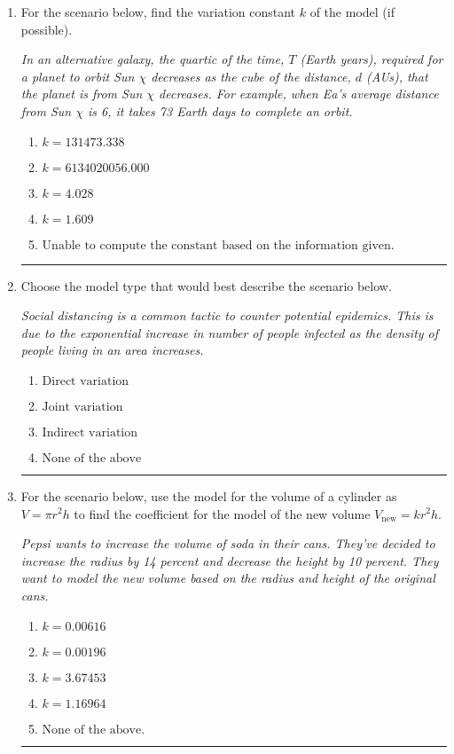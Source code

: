 \documentclass[14pt]{extbook}
\newcommand{\litem}[1]{\item#1\hspace*{-1cm}\rule{\textwidth}{0.4pt}}
\begin{document}
\begin{enumerate}
{\begin{enumerate}[label=\Alph*.]
\end{enumerate} }
\litem{
For the scenario below, find the variation constant $k$ of the model (if possible).
\begin{center}
    \textit{ In an alternative galaxy, the quartic of the time, $T$ (Earth years), required for a planet to orbit Sun $\chi$ decreases as the cube of the distance, $d$ (AUs), that the planet is from Sun $\chi$ decreases. For example, when Ea's average distance from Sun $\chi$ is 6, it takes 73 Earth days to complete an orbit. }
\end{center}
\begin{enumerate}[label=\Alph*.]
\item \( k = 131473.338 \)
\item \( k = 6134020056.000 \)
\item \( k = 4.028 \)
\item \( k = 1.609 \)
\item \( \text{Unable to compute the constant based on the information given.} \)

\end{enumerate} }
\litem{
Choose the model type that would best describe the scenario below.
\begin{center}
    \textit{ Social distancing is a common tactic to counter potential epidemics. This is due to the exponential increase in number of people infected as the density of people living in an area increases. }
\end{center}
\begin{enumerate}[label=\Alph*.]
\item \( \text{Direct variation} \)
\item \( \text{Joint variation} \)
\item \( \text{Indirect variation} \)
\item \( \text{None of the above} \)

\end{enumerate} }
\litem{
For the scenario below, use the model for the volume of a cylinder as $V = \pi r^2 h$ to find the coefficient for the model of the new volume $V_{\text{new}} = k r^2 h$.
\begin{center}
    \textit{ Pepsi wants to increase the volume of soda in their cans. They've decided to increase the radius by 14 percent and decrease the height by 10 percent. They want to model the new volume based on the radius and height of the original cans. }
\end{center}
\begin{enumerate}[label=\Alph*.]
\item \( k = 0.00616 \)
\item \( k = 0.00196 \)
\item \( k = 3.67453 \)
\item \( k = 1.16964 \)
\item \( \text{None of the above.} \)


\end{enumerate}}
\end{enumerate}
\end{document}

